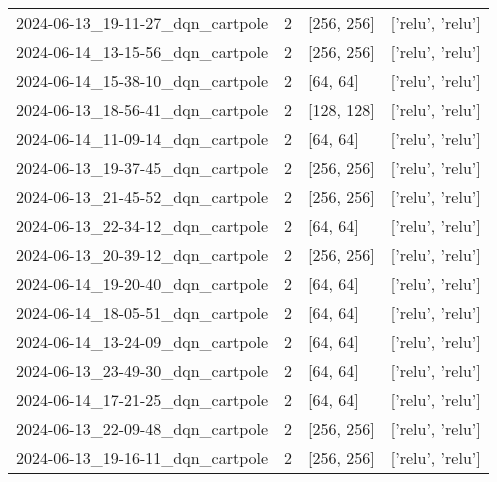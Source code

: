 \documentclass[a4paper,12pt]{article}
\begin{document}
\begin{center}
{\begin{tabular}{llll}
            2024-06-13\_19-11-27\_dqn\_cartpole & 2              & {[}256, 256{]}           & {[}'relu', 'relu'{]}                 \\
            2024-06-14\_13-15-56\_dqn\_cartpole & 2              & {[}256, 256{]}           & {[}'relu', 'relu'{]}                 \\
            2024-06-14\_15-38-10\_dqn\_cartpole & 2              & {[}64, 64{]}             & {[}'relu', 'relu'{]}                 \\
            2024-06-13\_18-56-41\_dqn\_cartpole & 2              & {[}128, 128{]}           & {[}'relu', 'relu'{]}                 \\
            2024-06-14\_11-09-14\_dqn\_cartpole & 2              & {[}64, 64{]}             & {[}'relu', 'relu'{]}                 \\
            2024-06-13\_19-37-45\_dqn\_cartpole & 2              & {[}256, 256{]}           & {[}'relu', 'relu'{]}                 \\
            2024-06-13\_21-45-52\_dqn\_cartpole & 2              & {[}256, 256{]}           & {[}'relu', 'relu'{]}                 \\
            2024-06-13\_22-34-12\_dqn\_cartpole & 2              & {[}64, 64{]}             & {[}'relu', 'relu'{]}                 \\
            2024-06-13\_20-39-12\_dqn\_cartpole & 2              & {[}256, 256{]}           & {[}'relu', 'relu'{]}                 \\
            2024-06-14\_19-20-40\_dqn\_cartpole & 2              & {[}64, 64{]}             & {[}'relu', 'relu'{]}                 \\
            2024-06-14\_18-05-51\_dqn\_cartpole & 2              & {[}64, 64{]}             & {[}'relu', 'relu'{]}                 \\
            2024-06-14\_13-24-09\_dqn\_cartpole & 2              & {[}64, 64{]}             & {[}'relu', 'relu'{]}                 \\
            2024-06-13\_23-49-30\_dqn\_cartpole & 2              & {[}64, 64{]}             & {[}'relu', 'relu'{]}                 \\
            2024-06-14\_17-21-25\_dqn\_cartpole & 2              & {[}64, 64{]}             & {[}'relu', 'relu'{]}                 \\
            2024-06-13\_22-09-48\_dqn\_cartpole & 2              & {[}256, 256{]}           & {[}'relu', 'relu'{]}                 \\
            2024-06-13\_19-16-11\_dqn\_cartpole & 2              & {[}256, 256{]}           & {[}'relu', 'relu'{]}                 \\
        \end{tabular}
    }
\end{center}
\end{document}
